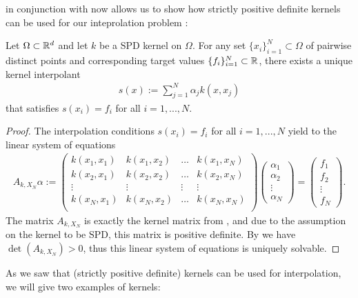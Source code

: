  in conjunction with  now allows us to show how strictly positive definite kernels can be used for our inteprolation problem :


\begin{thm}
Let $\Omega \subset \mathbb{R}^d$ and let $k$ be a SPD kernel on $\Omega$. 
For any set $\{ x_i \}_{i=1}^N \subset \Omega$ of pairwise distinct points and corresponding target values $\{ f_i \}_{i=1}^N \subset \mathbb{R}$,
there exists a unique kernel interpolant
\begin{align*}
s(x) := \sum_{j=1}^N \alpha_j k(x, x_j)
\end{align*}
that satisfies $s(x_i) = f_i$ for all $i=1, ..., N$. 
\end{thm}

\begin{proof}
The interpolation conditions $s(x_i) = f_i$ for all $i=1, ..., N$ yield to the linear system of equations
\begin{align}
\label{eq:lin_eq_system_kernel}
A_{k, X_N} \alpha := 
\begin{pmatrix}
k(x_1, x_1) & k(x_1, x_2) & \dots & k(x_1, x_N) \\
k(x_2, x_1) & k(x_2, x_2) & \dots & k(x_2, x_N) \\
\vdots & \vdots & \vdots & \vdots \\
k(x_N, x_1) & k(x_N, x_2) & \dots & k(x_N, x_N) \\
\end{pmatrix}
\begin{pmatrix}
\alpha_1 \\ \alpha_2 \\ \vdots \\ \alpha_N
\end{pmatrix}
=
\begin{pmatrix}
f_1 \\ f_2 \\ \vdots \\ f_N
\end{pmatrix}.
\end{align}
The matrix $A_{k, X_N}$ is exactly the kernel matrix from ,
and due to the assumption on the kernel to be SPD, this matrix is positive definite.
By  we have $\det(A_{k, X_N}) > 0$, thus this linear system of equations is uniquely solvable.
\end{proof}

As we saw that (strictly positive definite) kernels can be used for interpolation, 
we will give two examples of kernels:


